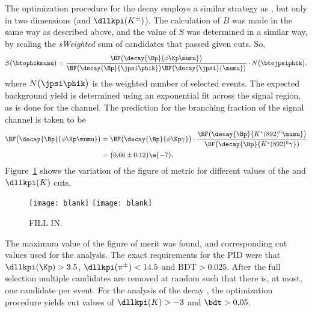 The optimization procedure for the decay \btophikmumu employs a similar strategy as \btokpipimumu,
but only in two dimensions  (\BDT and $\dllkpi(K^\pm)$).
The calculation of $B$ was made in the same way as described above, and the
value of $S$ was determined in a similar way, by scaling the \emph{sWeighted} sum of candidates
that passed given cuts.
So,
\begin{equation}
  S\big(\btophikmumu\big) = \\
  \frac{
    \BF\big(\decay{\Bp}{\phi\Kp\mumu}\big)
  }{
    \BF\big(\decay{\Bp}{\jpsi\phik}\big)
    \BF\big(\decay{\jpsi}{\mumu}\big)
  }
  \cdot
  N\big(\btojpsiphik\big).
\end{equation}
where $N\big(\jpsi\phik\big)$ is the weighted number of selected \btojpsiphik events.
The expected background yield is determined using an exponential fit across the signal region, as
is done for the \btokpipimumu channel.
The prediction for the branching fraction of the signal channel is taken to be
\begin{align}
  \BF\big(\decay{\Bp}{\phi\Kp\mumu}\big)
  &=
  \BF\big(\decay{\Bp}{\phi\Kp\gamma}\big)
  \cdot\frac{
    \BF\big(\decay{\Bp}{K^*(892)^0\mumu}\big)
  }{
    \BF\big(\decay{\Bp}{K^*(892)^0\gamma^{}}\big)
  }\nonumber\\
  &=\big(0.66\pm0.12\big)\e{-7}.
\end{align}
Figure~\ref{fig:phik:opt} shows the variation of the figure of metric for different values of the
\bdt and $\dllkpi(K)$ cuts.

\begin{figure}
  \begin{center}
    \texttt{[image: blank]}
    \texttt{[image: blank]}
    \caption{
      FILL IN.
    }
    \label{fig:phik:opt}
  \end{center}
\end{figure}

The maximum value of the figure of merit was found, and corresponding cut values used for the
analysis.
The exact requirements for the PID were that $\dllkpi(\Kp)>3.5$, $\dllkpi(\pi^\pm)<14.5$ and
$\mathrm{BDT}>0.025$.
After the full selection multiple candidates are removed at random such that there is, at most, one
\btokpipimumu candidate per event.
For the analysis of the decay \btophikmumu, the optimization procedure yields cut values of
$\dllkpi(K)>-3$ and $\bdt>0.05$.


